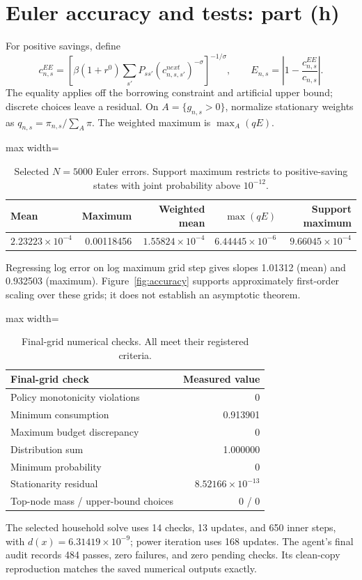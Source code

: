 \documentclass[10pt]{article}
\begin{document}
\clearpage
\section{Euler accuracy and tests: part (h)}
For positive savings, define
\[
c^{EE}_{n,s}=\left[\beta(1+r^0)\sum_{s'}P_{ss'}
(c^{next}_{n,s,s'})^{-\sigma}\right]^{-1/\sigma},
\qquad E_{n,s}=\left|1-\frac{c^{EE}_{n,s}}{c_{n,s}}\right|.
\]
The equality applies off the borrowing constraint and artificial upper bound;
discrete choices leave a residual. On $A=\{g_{n,s}>0\}$, normalize stationary
weights as $q_{n,s}=\pi_{n,s}/\sum_A\pi$. The weighted maximum is $\max_A(qE)$.
\begin{table}[H]\centering\small
\caption{Selected $N=5000$ Euler errors. Support maximum restricts to positive-saving states with joint probability above $10^{-12}$.}\label{tab:accuracy}
\begin{adjustbox}{max width=\linewidth}
\begin{tabular}{lrrrr}
\toprule
Mean & Maximum & Weighted mean & $\max(qE)$ & Support maximum \\
\midrule
$2.23223\times10^{-4}$ & 0.00118456 & $1.55824\times10^{-4}$ & $6.44445\times10^{-6}$ & $9.66045\times10^{-4}$ \\
\bottomrule
\end{tabular}
\end{adjustbox}\end{table}
Regressing log error on log maximum grid step gives slopes 1.01312 (mean) and
0.932503 (maximum). Figure~\ref{fig:accuracy} supports approximately first-order
scaling over these grids; it does not establish an asymptotic theorem.
\begin{table}[H]\centering\small
\caption{Final-grid numerical checks. All meet their registered criteria.}\label{tab:checks}
\begin{adjustbox}{max width=\linewidth}
\begin{tabular}{lr}
\toprule
Final-grid check & Measured value \\
\midrule
Policy monotonicity violations & 0 \\
Minimum consumption & 0.913901 \\
Maximum budget discrepancy & 0 \\
Distribution sum & 1.000000 \\
Minimum probability & 0 \\
Stationarity residual & $8.52166\times10^{-13}$ \\
Top-node mass / upper-bound choices & 0 / 0 \\
\bottomrule
\end{tabular}
\end{adjustbox}\end{table}
The selected household solve uses 14 checks, 13 updates, and 650 inner steps,
with $d(x)=6.31419\times10^{-9}$; power iteration uses 168 updates.
The agent's final audit records 484 passes, zero failures, and zero pending checks.
Its clean-copy reproduction matches the saved numerical outputs exactly.
\end{document}
